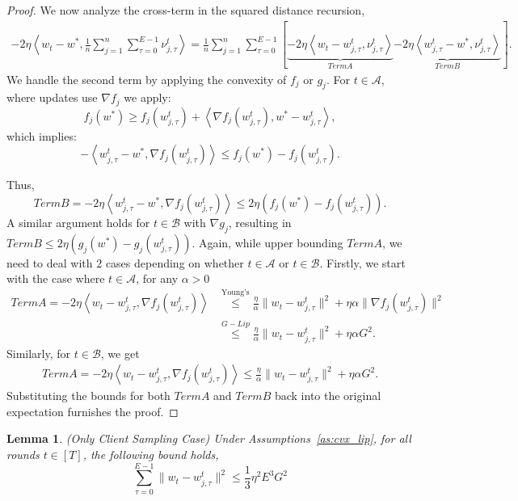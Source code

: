 \documentclass{article} %
\newtheorem{lemma}[]{Lemma}
\def\A{{\mathcal A}}
\def\B{{\mathcal B}}
\begin{document}
\begin{proof}
We now analyze the cross-term in the squared distance recursion,
\begin{gather*}
-2\eta \left\langle w_t - w^*, \frac{1}{n} \sum_{j=1}^n \sum_{\tau=0}^{E-1} \nu_{j,\tau}^t  \right\rangle
= \frac{1}{n} \sum_{j=1}^n \sum_{\tau=0}^{E-1} \left[\underbrace{-2\eta\left\langle w_t - w_{j,\tau}^t, \nu_{j,\tau}^t \right\rangle}_{Term A} \underbrace{-2\eta\left\langle w_{j,\tau}^t - w^*, \nu_{j,\tau}^t \right\rangle}_{Term B}\right].
\end{gather*}
We handle the second term by applying the convexity of  $f_j$  or $g_j$. For $ t \in \A$, where updates use $\nabla f_j$ we apply:
\[
f_j(w^*) \geq f_j(w_{j,\tau}^t) + \left\langle \nabla f_j(w_{j,\tau}^t), w^* - w_{j,\tau}^t \right\rangle,
\]
which implies:
\[
- \left\langle w_{j,\tau}^t - w^*, \nabla f_j(w_{j,\tau}^t) \right\rangle \leq f_j(w^*) - f_j(w_{j,\tau}^t).
\]

Thus,
\[
Term B = -2\eta \left\langle w_{j,\tau}^t - w^*, \nabla f_j(w_{j,\tau}^t) \right\rangle \leq 2\eta \left( f_j(w^*) - f_j(w_{j,\tau}^t) \right).
\]
A similar argument holds for $t \in \B$  with  $\nabla g_j$, resulting in $Term B \leq 2\eta \left( g_j(w^*) - g_j(w_{j,\tau}^t) \right)$. Again, while upper bounding $Term A$, we need to deal with 2 cases depending on whether $t\in \A$ or $t \in \B$. Firstly, we start with the case where $t \in \A$, for any $\alpha>0$
\begin{align*}
    Term A = -2\eta \left\langle w_t - w_{j,\tau}^t, \nabla f_j(w_{j,\tau}^t) \right\rangle &\overset{\text{Young's}}{\leq} \frac{\eta}{\alpha} \| w_t - w_{j,\tau}^t \|^2 + \eta \alpha \| \nabla f_j(w_{j,\tau}^t) \|^2
    \\
    &\overset{G-Lip}{\leq} \frac{\eta}{\alpha} \| w_t - w_{j,\tau}^t \|^2 + \eta \alpha G^2.
\end{align*}
Similarly, for $t\in \B$, we get
\begin{align*}
    Term A = -2\eta \left\langle w_t - w_{j,\tau}^t, \nabla f_j(w_{j,\tau}^t) \right\rangle \leq \frac{\eta}{\alpha} \| w_t - w_{j,\tau}^t \|^2 + \eta \alpha G^2.
\end{align*}
Substituting the bounds for both $ TermA$ and $TermB$ back into the original expectation furnishes the proof.
\end{proof}
\begin{lemma}(Only Client Sampling Case)
\label{lem:iterate_diff}
Under Assumptions~\ref{as:cvx_lip}, for all rounds $t\in[T]$, the following bound holds,
$$\sum_{\tau = 0}^{E-1}\|w_t - w_{j,\tau}^t\|^2 \leq \frac{1}{3}\eta^2 E^3 G^2 $$
\end{lemma}
\end{document}
